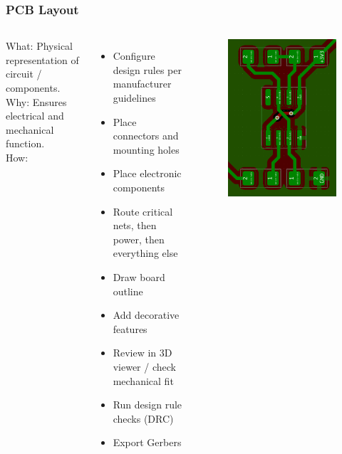 \documentclass[aspectratio=169, t]{beamer}
\begin{document}
\begin{frame}
\frametitle{PCB Layout}
\begin{columns}
	What: Physical representation of circuit / components.\\
	Why: Ensures electrical and mechanical function.\\
	How:
	\begin{itemize}
		\item Configure design rules per manufacturer guidelines
		\item Place connectors and mounting holes
		\item Place electronic components
		\item Route critical nets, then power, then everything else
		\item Draw board outline
		\item Add decorative features
		\item Review in 3D viewer / check mechanical fit
		\item Run design rule checks (DRC)
		\item Export Gerbers
	\end{itemize}
	
	\vspace{-7mm}
	\begin{figure}
		\includegraphics[width=0.8\linewidth]{images/555-layout.png}
	\end{figure}
\end{columns}
\end{frame}
\end{document}
